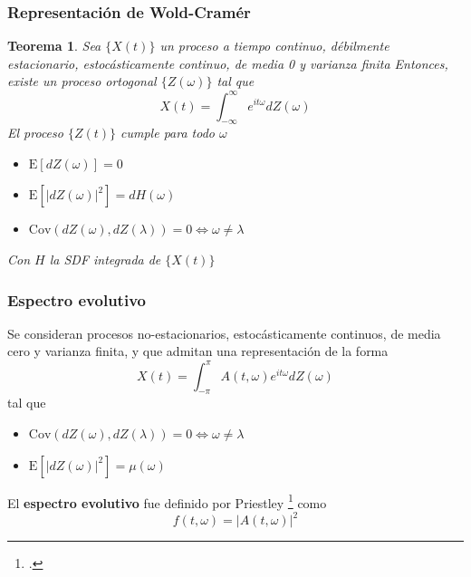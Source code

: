 \documentclass{beamer}
\newtheorem{thrm}{Teorema}
\newcommand{\intR}{\int_{-\infty}^{\infty}}
\newcommand{\intPI}{\int_{-\pi}^{\pi}}
\newcommand{\E}[1]{\mathrm{E}\left[ #1 \right]}
\newcommand{\Cov}[1]{\mathrm{Cov}\left( #1 \right)}
\newcommand{\abso}[1]{\left| #1 \right|}
\begin{document}
\begin{frame}\frametitle{Representaci\'on de Wold-Cram\'er}
\begin{thrm}
Sea $\{X(t)\}$ un proceso a tiempo continuo, d\'ebilmente estacionario,
estoc\'asticamente continuo, de media 0 y 
varianza finita
Entonces, existe un proceso ortogonal $\{Z(\omega)\}$ tal que
\begin{equation*}
X(t) = \intR e^{i t \omega} dZ(\omega)
\end{equation*}
El proceso $\{Z(t)\}$ cumple para todo $\omega$
\begin{itemize}
\item $\E{dZ(\omega)} = 0$
\item $\E{\abso{dZ(\omega)}^{2}} = dH(\omega)$
\item $\Cov{dZ(\omega),dZ(\lambda)} = 0 \Leftrightarrow \omega \neq \lambda$
\end{itemize}
Con $H$ la SDF integrada de $\{X(t)\}$
\end{thrm}
\end{frame}

\begin{frame}\frametitle{Espectro evolutivo}
Se consideran procesos no-estacionarios, estoc\'asticamente continuos, de media cero y varianza finita,
y que admitan una representaci\'on de la forma
\begin{equation*}
X(t) = \intPI A(t,\omega) e^{i t \omega} dZ(\omega)
\end{equation*}
tal que 
\begin{itemize}
\item $\Cov{dZ(\omega),dZ(\lambda)} = 0 \Leftrightarrow \omega \neq \lambda$
\item $\E{\abso{dZ(\omega)}^{2}} = \mu(\omega)$
\end{itemize}

El \textbf{espectro evolutivo} fue definido por Priestley \footcite{Priestley65} como
\begin{equation*}
f(t,\omega) = \abso{A(t,\omega)}^{2}
\end{equation*}
\end{frame}

\end{document}
